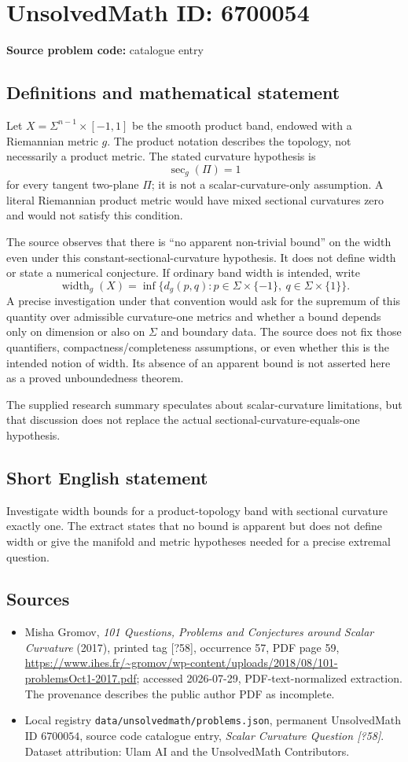 \documentclass[11pt]{article}
\begin{document}
\section*{UnsolvedMath ID: 6700054}
\textbf{Source problem code:} catalogue entry
\subsection{Definitions and mathematical statement}
Let $X=\Sigma^{n-1}\times[-1,1]$ be the smooth product band, endowed with a Riemannian metric $g$. The product notation describes the topology, not necessarily a product metric. The stated curvature hypothesis is
\[
\operatorname{sec}_g(\Pi)=1
\]
for every tangent two-plane $\Pi$; it is not a scalar-curvature-only assumption. A literal Riemannian product metric would have mixed sectional curvatures zero and would not satisfy this condition.

The source observes that there is ``no apparent non-trivial bound'' on the width even under this constant-sectional-curvature hypothesis. It does not define width or state a numerical conjecture. If ordinary band width is intended, write
\[
\operatorname{width}_g(X)
=\inf\{d_g(p,q):p\in\Sigma\times\{-1\},\ q\in\Sigma\times\{1\}\}.
\]
A precise investigation under that convention would ask for the supremum of this quantity over admissible curvature-one metrics and whether a bound depends only on dimension or also on $\Sigma$ and boundary data. The source does not fix those quantifiers, compactness/completeness assumptions, or even whether this is the intended notion of width. Its absence of an apparent bound is not asserted here as a proved unboundedness theorem.

The supplied research summary speculates about scalar-curvature limitations, but that discussion does not replace the actual sectional-curvature-equals-one hypothesis.
\subsection{Short English statement}
Investigate width bounds for a product-topology band with sectional curvature exactly one. The extract states that no bound is apparent but does not define width or give the manifold and metric hypotheses needed for a precise extremal question.
\subsection{Sources}
\begin{itemize}
\item Misha Gromov, \emph{101 Questions, Problems and Conjectures around Scalar Curvature} (2017), printed tag [?58], occurrence 57, PDF page 59, \url{https://www.ihes.fr/~gromov/wp-content/uploads/2018/08/101-problemsOct1-2017.pdf}; accessed 2026-07-29, PDF-text-normalized extraction. The provenance describes the public author PDF as incomplete.
\item Local registry \texttt{data/unsolvedmath/problems.json}, permanent UnsolvedMath ID $6700054$, source code catalogue entry, \emph{Scalar Curvature Question [?58]}. Dataset attribution: Ulam AI and the UnsolvedMath Contributors.
\end{itemize}
\end{document}
